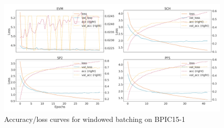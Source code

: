 \begin{figure}[!htb]
    \centering
    \includegraphics[width=\textwidth]{gfx/bpic2015_1/windowed_loss_acc_curve.png}
    \caption{Accuracy/loss curves for windowed batching on BPIC15-1}
\end{figure}
\FloatBarrier


